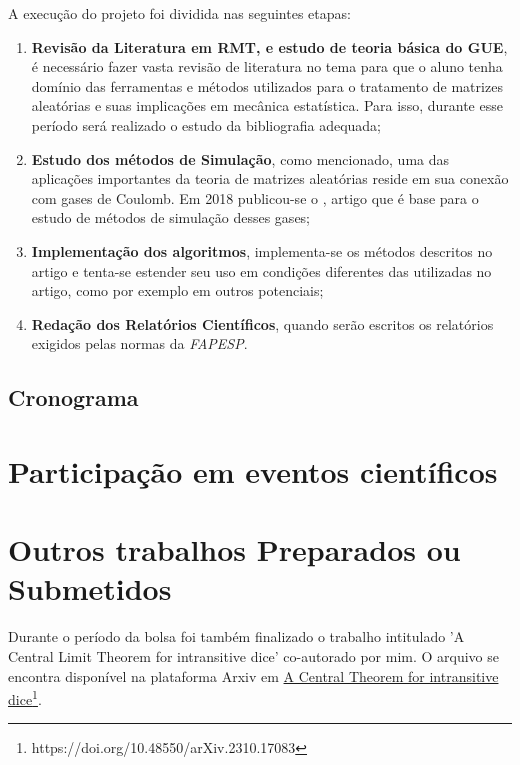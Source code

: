 \documentclass[12pt]{report}
\begin{document}
	A execução do projeto foi dividida nas seguintes etapas:
	
	\begin{enumerate}
		\item \textbf{Revisão da Literatura em RMT, e estudo de teoria básica do GUE}, é necessário fazer vasta revisão de literatura no tema para que o aluno tenha domínio das ferramentas e métodos utilizados para o tratamento de matrizes aleatórias e suas implicações em mecânica estatística. Para isso, durante esse período será realizado o estudo da bibliografia adequada;
		
		\item \textbf{Estudo dos métodos de Simulação}, como mencionado, uma das aplicações importantes da teoria de matrizes aleatórias reside em sua conexão com gases de Coulomb. Em 2018 publicou-se o \cite{Chafa__2018}, artigo que é base para o estudo de métodos de simulação desses gases;
		
		\item \textbf{Implementação dos algoritmos}, implementa-se os métodos descritos no artigo e tenta-se estender seu uso em condições diferentes das utilizadas no artigo, como por exemplo em outros potenciais;
		
		\item \textbf{Redação dos Relatórios Científicos}, quando serão escritos os relatórios exigidos pelas normas da \textit{FAPESP}.
		
	\end{enumerate}
	
	\section{Cronograma}
	
	
	
	{\let\clearpage\relax \chapter{Participação em eventos científicos}}\label{chp:particEvento}
	
	
	
	{\let\clearpage\relax \chapter{Outros trabalhos Preparados ou Submetidos}}\label{chp:trabalhos}
	
	Durante o período da bolsa foi também finalizado o trabalho intitulado 'A Central Limit Theorem for intransitive dice' co-autorado por mim. O arquivo se encontra disponível na plataforma Arxiv em \href{https://doi.org/10.48550/arXiv.2310.17083}{A Central Theorem for intransitive dice}\footnote{https://doi.org/10.48550/arXiv.2310.17083}.
	
\end{document}
